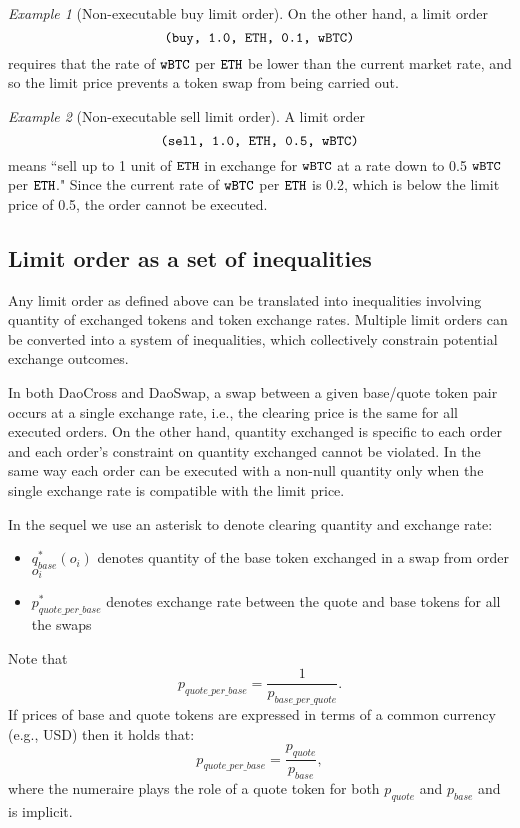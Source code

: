 \documentclass[11pt, reqno]{amsart}
\theoremstyle{definition}
\theoremstyle{remark}
\newtheorem{exmp}{Example}[subsection]
\newcommand{\BTC}{\textnormal{\texttt{wBTC}}}
\newcommand{\ETH}{\textnormal{\texttt{ETH}}}
\newcommand{\buy}{\textnormal{\texttt{buy}}}
\newcommand{\sell}{\textnormal{\texttt{sell}}}
\begin{document}
\begin{exmp}[Non-executable buy limit order]
On the other hand, a limit order
\[
    \texttt{(\buy, 1.0, $\ETH$, 0.1, $\BTC$)}
\]
requires that the rate of $\BTC$ per $\ETH$ be lower than the current market
rate, and so the limit price prevents a token swap from being carried out.
\end{exmp}

\begin{exmp}[Non-executable sell limit order]
A limit order
\[
    \texttt{(\sell, 1.0, $\ETH$, 0.5, $\BTC$)}
\]
means
``sell up to 1 unit of $\ETH$ in exchange for $\BTC$ at a rate down to 0.5 $\BTC$ per $\ETH$."
Since the current rate of $\BTC$ per $\ETH$ is 0.2, which is below the limit
price of 0.5, the order cannot be executed.
\end{exmp}

\subsection{Limit order as a set of inequalities}
Any limit order as defined above can be translated into inequalities involving
quantity of exchanged tokens and token exchange rates. Multiple limit orders
can be converted into a system of inequalities, which collectively constrain
potential exchange outcomes.

In both DaoCross and DaoSwap, a swap between a given base/quote token pair
occurs at a single exchange rate, i.e., the clearing price is the same for
all executed orders. On the other hand, quantity exchanged is specific to
each order and each order's constraint on quantity exchanged cannot be
violated. In the same way each order can be executed with a non-null quantity
only when the single exchange rate is compatible with the limit price.

In the sequel we use an asterisk to denote clearing quantity and exchange
rate:
\begin{itemize}
	\item $q_{base}^*(o_i)$ denotes quantity of the base token exchanged in a
	      swap from order $o_i$
	\item $p_{quote\_per\_base}^*$ denotes exchange rate between the quote
	      and base tokens for all the swaps
\end{itemize}
Note that
\[
	p_{quote\_per\_base} =
	\frac{1}{p_{base\_per\_quote}}.
\]
If prices of base and quote tokens are expressed in terms of a common currency
(e.g., USD) then it holds that:
\[
	p_{quote\_per\_base} = \frac{p_{quote}}{p_{base}},
\]
where the numeraire plays the role of a quote token for both
$p_{quote}$ and $p_{base}$ and is implicit.
\end{document}
